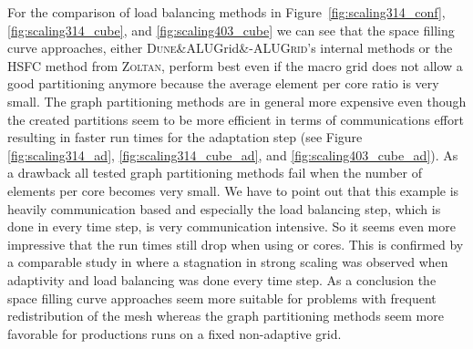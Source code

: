 \documentclass[10pt,notitlepage,a4paper]{article}
\newcommand{\dune}[1][]{\textsc{Dune}\ifx&#1&\else\textsc{-{#1}}\fi\xspace}
\newcommand{\zoltan}{\textsc{Zoltan}\xspace}
\begin{document}
For the comparison of load balancing methods in 
Figure~\ref{fig:scaling314_conf}, \ref{fig:scaling314_cube}, and \ref{fig:scaling403_cube} 
we can see that the
space filling curve approaches, either \dune[ALUGrid]'s internal methods 
or the HSFC method from \zoltan, 
perform best even if the macro grid does not allow a good partitioning
anymore because the average element per core ratio is very small. The graph
partitioning methods are in general more expensive even though the created partitions 
seem to be more efficient in terms of communications effort resulting in faster run
times for the adaptation step (see Figure \ref{fig:scaling314_ad},
\ref{fig:scaling314_cube_ad}, and \ref{fig:scaling403_cube_ad}).
As a drawback all tested graph partitioning methods fail when the number of elements per core 
becomes very small. We have to point out that this example is 
heavily communication based and especially
the load balancing step, which is done in every time step, is very communication
intensive. So it seems even more impressive that the run times still drop when 
using  or  cores. 
This is confirmed by a comparable study in \cite{amdis2} where a stagnation in strong
scaling was observed when adaptivity and load balancing was done every time step. 
As a conclusion the space filling curve approaches seem 
more suitable for problems with frequent redistribution of the mesh whereas the graph
partitioning methods seem more favorable for productions runs on a fixed non-adaptive
grid.
\end{document}
